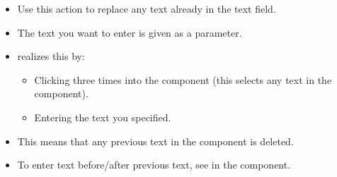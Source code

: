 \begin{itemize}
\item Use this action to replace any text already in the text field.
\item The text you want to enter is given as a parameter.
\item \app{} realizes this by:
\begin{itemize}
\item Clicking three times into the component (this selects any text in the component).
\item Entering the text you specified.
\end{itemize}
\item This means that any previous text in the component is deleted. 
\item To enter text before/after previous text, see  in the  component.
\end{itemize}
 